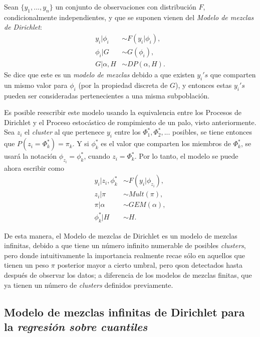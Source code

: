 Sean $\{y_1,...,y_n\}$ un conjunto de observaciones con distribuci\'on $F$, condicionalmente independientes, y que se suponen vienen del \textit{Modelo de mezclas de Dirichlet}:
\begin{equation*}
\begin{aligned}
   y_i | \phi_i &\sim F(y_i | \phi_i), \\
   \phi_i | G &\sim G(\phi_i), \\
   G | \alpha, H &\sim DP(\alpha,H).
\end{aligned}
\end{equation*}
Se dice que este es un \textit{modelo de mezclas} debido a que existen $y_i's$ que comparten un mismo valor para $\phi_i$ (por la propiedad discreta de $G$), y entonces estas $y_i's$ pueden ser consideradas pertenecientes a una misma subpoblaci\'on.

Es posible reescribir este modelo usando la equivalencia entre los Procesos de Dirichlet y el Proceso estoc\'astico de rompimiento de un palo, visto anteriormente. Sea $z_i$ el \textit{cluster} al que pertenece $y_i$ entre los $\Phi_1^*,\Phi_2^*,...$ posibles, se tiene entonces que $P(z_i = \Phi_k^*) = \pi_k$. Y si $\phi_k^*$ es el valor que comparten los miembros de $\Phi_k^*$, se usar\'a la notaci\'on $\phi_{z_i} = \phi_k^*$, cuando $z_i = \Phi_k^*$. Por lo tanto, el modelo se puede ahora escribir como
\begin{equation*}
\begin{aligned}
   y_i | z_i, \phi_k^* &\sim F(y_i | \phi_{z_i}), \\
   z_i | \pi &\sim Mult(\pi), \\
   \pi | \alpha &\sim GEM(\alpha), \\
   \phi_k^* | H &\sim H.
\end{aligned}
\end{equation*}

De esta manera, el Modelo de mezclas de Dirichlet es un modelo de mezclas infinitas, debido a que tiene un n\'umero infinito numerable de posibles \textit{clusters}, pero donde intuitivamente la importancia realmente recae s\'olo en aquellos que tienen un peso $\pi$ posterior mayor a cierto umbral, pero qson detectados hasta despu\'es de observar los datos; a diferencia de los modelos de mezclas finitas, que ya tienen un n\'umero de \textit{clusters} definidos previamente.

\subsection{Modelo de mezclas infinitas de Dirichlet para la \textit{regresi\'on sobre cuantiles}}

